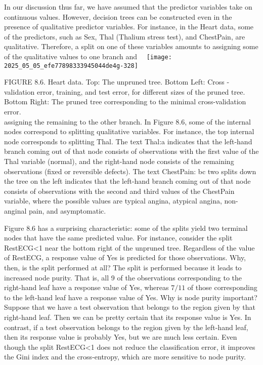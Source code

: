 \documentclass[10pt]{article}
\begin{document}
In our discussion thus far, we have assumed that the predictor variables take on continuous values. However, decision trees can be constructed even in the presence of qualitative predictor variables. For instance, in the Heart data, some of the predictors, such as Sex, Thal (Thalium stress test), and ChestPain, are qualitative. Therefore, a split on one of these variables amounts to assigning some of the qualitative values to one branch and\
\
\texttt{[image: 2025\_05\_05\_efe77898333945044de4g-328]}

FIGURE 8.6. Heart data. Top: The unpruned tree. Bottom Left: Cross -validation error, training, and test error, for different sizes of the pruned tree. Bottom Right: The pruned tree corresponding to the minimal cross-validation error.\\
assigning the remaining to the other branch. In Figure 8.6, some of the internal nodes correspond to splitting qualitative variables. For instance, the top internal node corresponds to splitting Thal. The text Thal:a indicates that the left-hand branch coming out of that node consists of observations with the first value of the Thal variable (normal), and the right-hand node consists of the remaining observations (fixed or reversible defects). The text ChestPain: bc two splits down the tree on the left indicates that the left-hand branch coming out of that node consists of observations with the second and third values of the ChestPain variable, where the possible values are typical angina, atypical angina, non-anginal pain, and asymptomatic.


Figure 8.6 has a surprising characteristic: some of the splits yield two terminal nodes that have the same predicted value. For instance, consider the split RestECG<1 near the bottom right of the unpruned tree. Regardless of the value of RestECG, a response value of Yes is predicted for those observations. Why, then, is the split performed at all? The split is performed because it leads to increased node purity. That is, all 9 of the observations corresponding to the right-hand leaf have a response value of Yes, whereas $7 / 11$ of those corresponding to the left-hand leaf have a response value of Yes. Why is node purity important? Suppose that we have a test observation that belongs to the region given by that right-hand leaf. Then we can be pretty certain that its response value is Yes. In contrast, if a test observation belongs to the region given by the left-hand leaf, then its response value is probably Yes, but we are much less certain. Even though the split RestECG<1 does not reduce the classification error, it improves the Gini index and the cross-entropy, which are more sensitive to node purity.
\end{document}
